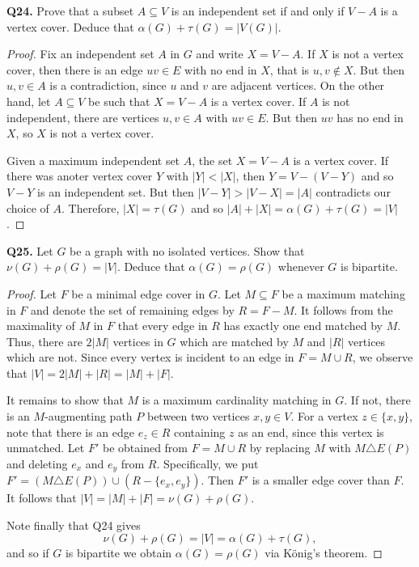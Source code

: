 \noindent \textbf{Q24.} Prove that a subset \( A \subseteq V \) is an independent set if and only if \( V - A \) is a vertex cover. Deduce that \( \alpha (G) + \tau (G) = |V(G)| \). 
\begin{proof}
Fix an independent set \( A \) in \( G \) and write \( X = V - A \). If \( X \) is not a vertex cover, then there is an edge \( uv \in E \) with no end in \( X \), that is \( u, v \notin X \). But then \( u, v \in A \) is a contradiction, since \( u \) and \( v \) are adjacent vertices. On the other hand, let \( A \subseteq V \) be such that \( X = V - A \) is a vertex cover. If \( A \) is not independent, there are vertices \( u,v \in A \) with \( uv \in E \). But then \( uv \) has no end in \( X \), so \( X \) is not a vertex cover.

Given a maximum independent set \( A \), the set \( X = V - A \) is a vertex cover. If there was anoter vertex cover \( Y \) with \( |Y| < |X| \), then \( Y = V - (V - Y) \) and so \( V - Y \) is an independent set. But then \( |V - Y| > |V - X| = |A| \) contradicts our choice of \( A \). Therefore, \( |X| = \tau (G) \) and so \( |A| + |X| = \alpha (G) + \tau (G) = |V| \). 
\end{proof}
\noindent \textbf{Q25.} Let \( G \) be a graph with no isolated vertices. Show that \( \nu (G) + \rho (G) = |V| \). Deduce that \( \alpha (G) = \rho (G) \) whenever \( G \) is bipartite.
\begin{proof}
Let \( F \) be a minimal edge cover in \( G \). Let \( M \subseteq F \) be a maximum matching in \( F \) and denote the set of remaining edges by \( R = F - M \). It follows from the maximality of \( M \) in \( F \) that every edge in \( R \) has exactly one end matched by \( M \). Thus, there are \( 2|M| \) vertices in \( G \) which are matched by \( M \) and \( |R| \) vertices which are not. Since every vertex is incident to an edge in \( F = M \cup R \), we observe that \( |V| = 2|M| + |R| = |M| + |F| \).

It remains to show that \( M \) is a maximum cardinality matching in \( G \). If not, there is an \( M \)-augmenting path \( P \) between two vertices \( x,y \in V \). For a vertex \( z \in \{ x,y \}  \), note that there is an edge \( e_{z} \in R \) containing \( z \) as an end, since this vertex is unmatched. Let \( F' \) be obtained from \( F = M \cup R \) by replacing \( M \) with \( M \triangle E(P) \) and deleting \( e_{x}  \) and \( e_{y}  \) from \( R \). Specifically, we put \( F' = (M \triangle E(P)) \cup (R - \{ e_{x} , e_{y}  \} ) \). Then \( F' \) is a smaller edge cover than \( F \). It follows that \( |V| = |M| + |F| = \nu (G) + \rho (G) \).

Note finally that Q24 gives \[ \nu (G) + \rho (G) = |V| = \alpha (G) + \tau (G), \] and so if \( G \) is bipartite we obtain \( \alpha (G) = \rho (G) \) via K\"onig's theorem.
\end{proof}
